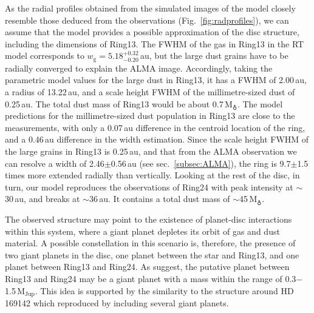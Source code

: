\documentclass[fleqn,usenatbib,useAMS]{mnras}
\begin{document}
As the radial profiles obtained from the simulated images of the model closely resemble those deduced from the observations (Fig.~\ref{fig:radprofiles}), we can assume that the model provides a possible approximation of the disc structure, including the dimensions of Ring13. The FWHM of the gas in Ring13 in the RT model corresponds to $w_\mathrm{g} = 5.18^{+0.32}_{-0.20}$\,au, but the  large dust grains have to be radially converged to explain the ALMA image. Accordingly, taking the parametric model values for the large dust in Ring13, it has a FWHM of 2.00\,au, a radius of 13.22\,au, and a scale height FWHM of the millimetre-sized dust of 0.25\,au. The total dust mass of Ring13 would be about 0.7\,M$_{\earth}$. The model predictions for the millimetre-sized dust population in Ring13 are close to the measurements, with only a 0.07\,au difference in the centroid location of the ring, and a 0.46\,au difference in the width estimation. Since the scale height FWHM of the large grains in Ring13 is 0.25\,au, and that from the ALMA observation we can resolve a width of 2.46$\pm$0.56\,au (see sec.~\ref{subsec:ALMA}), the ring is 9.7$\pm$1.5 times more extended radially than vertically. Looking at the rest of the disc, in turn, our model reproduces the observations of Ring24 with peak intensity at $\sim$30\,au, and breaks at $\sim$36\,au. It contains a total dust mass of $\sim$45\,M$_{\earth}$.%

The observed structure may point to the existence of planet-disc interactions within this system, where a giant planet depletes its orbit of gas and dust material. A possible constellation in this scenario is, therefore, the presence of two giant planets in the disc, one planet between the star and Ring13, and one planet between Ring13 and Ring24. As \citet{Ru_z_Rodr_guez_2019} suggest, the putative planet between Ring13 and Ring24 may be a giant planet with a mass within the range of 0.3$-$1.5\,$\mathrm{M}_{\mathrm{Jup}}$. This idea is supported by the similarity to the structure around HD\,169142 which \citet{2020arXiv200711565B} reproduced by including several giant planets.
\end{document}
